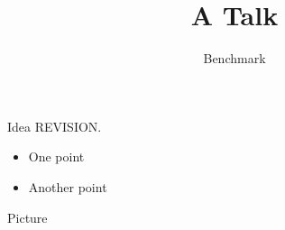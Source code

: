 \documentclass{beamer}
\title{A Talk}
\author{Benchmark}
\begin{document}
\begin{frame}
  \titlepage
\end{frame}
\begin{frame}{Idea}
  REVISION.
  \begin{itemize}
    \item One point
    \item Another point
  \end{itemize}
\end{frame}
\begin{frame}{Picture}
\end{frame}
\end{document}
